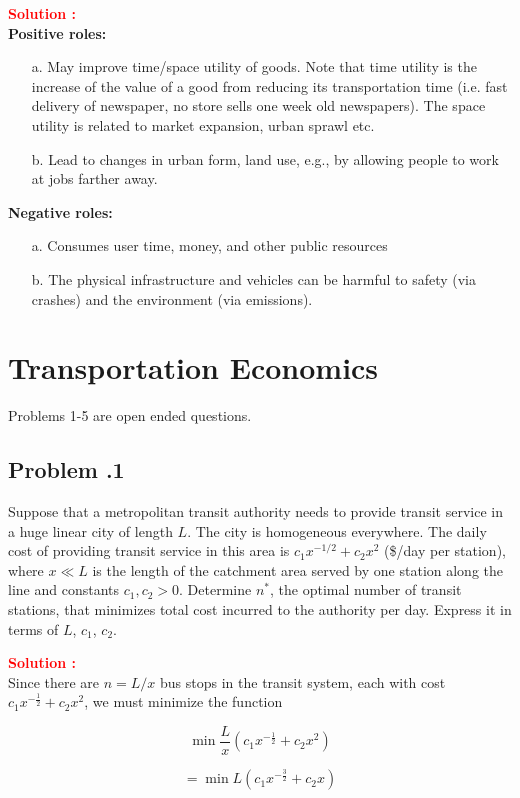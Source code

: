 \documentclass[12pt]{article}
\newcommand{\customsubsection}[1]{
  \subsection*{Problem \thesection.#1}
}
\begin{document}
\textbf{\textcolor{red}{Solution :}} \\
\textbf{Positive roles:} 

\begin{itemize}
    \item [a.] May improve time/space utility of goods. Note that time utility is the increase of the value of a good from reducing its transportation time (i.e. fast delivery of newspaper, no store sells one week old newspapers). The space utility is related to market expansion, urban sprawl etc. 
    \item [b.] Lead to changes in urban form, land use, e.g., by allowing people to work at jobs farther away. 
\end{itemize}

\textbf{Negative roles:} 
\begin{itemize}
    \item [a.] Consumes user time, money, and other public resources 
    \item [b.] The physical infrastructure and vehicles can be harmful to safety (via crashes) and the environment (via emissions).
\end{itemize}

\newpage




\section{Transportation Economics}
Problems 1-5 are open ended questions.

\customsubsection{1}
Suppose that a metropolitan transit authority needs to provide transit service in a huge linear city of length $L$. The city is homogeneous everywhere. The daily cost of providing transit service in this area is $c_1 x^{-1/2} + c_2 x^2$ (\$/day per station), where $x \ll L$ is the length of the catchment area served by one station along the line and constants $c_1, c_2 > 0$. Determine $n^*$, the optimal number of transit stations, that minimizes total cost incurred to the authority per day. Express it in terms of $L$, $c_1$, $c_2$. 


\textbf{\textcolor{red}{Solution :}} \\
Since there are $n = L/x$ bus stops in the transit system, each with cost $c_1x^{-\frac{1}{2}} + c_2x^2$, we must minimize the function

\[
\min \frac{L}{x}\left( c_1 x^{-\frac{1}{2}} + c_2 x^2 \right)
\]

\[
 = \min L\left( c_1 x^{-\frac{3}{2}} + c_2 x \right)
\]
\end{document}
